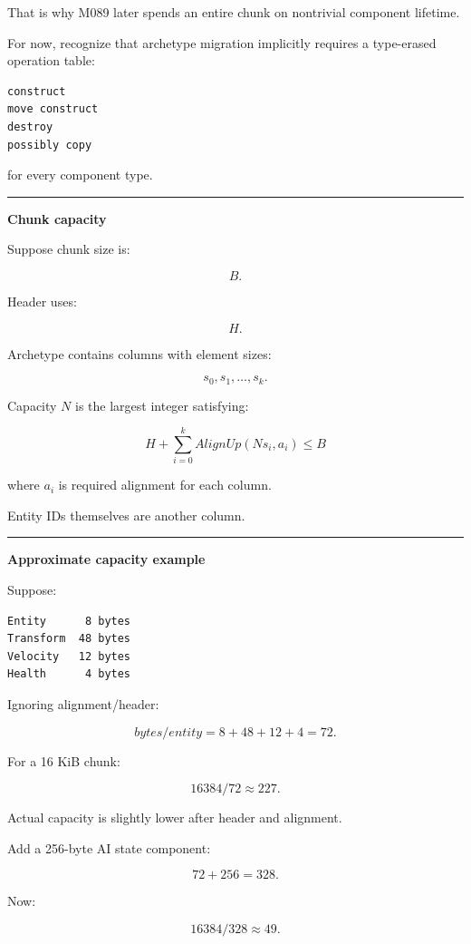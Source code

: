 That is why M089 later spends an entire chunk on nontrivial component lifetime.

For now, recognize that archetype migration implicitly requires a type-erased operation table:

\begin{verbatim}
construct
move construct
destroy
possibly copy
\end{verbatim}

for every component type.

\begin{center}\rule{0.5\linewidth}{0.5pt}\end{center}

\textbf{Chunk capacity}

Suppose chunk size is:

\[
B.
\]

Header uses:

\[
H.
\]

Archetype contains columns with element sizes:

\[
s_0,s_1,\dots,s_k.
\]

Capacity \(N\) is the largest integer satisfying:

\[
\boxed{
H+
\sum_{i=0}^{k}
AlignUp(Ns_i,a_i)
\le B
}
\]

where \(a_i\) is required alignment for each column.

Entity IDs themselves are another column.

\begin{center}\rule{0.5\linewidth}{0.5pt}\end{center}

\textbf{Approximate capacity example}

Suppose:

\begin{verbatim}
Entity      8 bytes
Transform  48 bytes
Velocity   12 bytes
Health      4 bytes
\end{verbatim}

Ignoring alignment/header:

\[
bytes/entity
=
8+48+12+4
=
72.
\]

For a 16 KiB chunk:

\[
16384/72
\approx227.
\]

Actual capacity is slightly lower after header and alignment.

Add a 256-byte AI state component:

\[
72+256=328.
\]

Now:

\[
16384/328
\approx49.
\]

